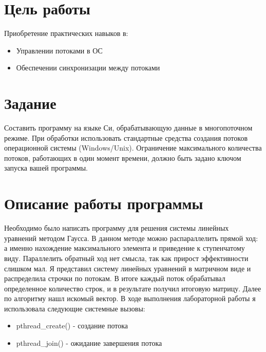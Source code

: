 \documentclass[a4paper, 12pt]{article}
\begin{document}
\section{Цель работы}
Приобретение практических навыков в:
\begin{itemize}
  \item Управлении потоками в ОС
  \item Обеспечении синхронизации между потоками
\end{itemize}

\section{Задание}
Составить программу на языке Си, обрабатывающую данные в многопоточном режиме. При обработки использовать стандартные средства создания потоков операционной системы (Windows/Unix). Ограничение максимального количества потоков, работающих в один момент времени, должно быть задано ключом запуска вашей программы.

\section{Описание работы программы}
Необходимо было написать программу для решения системы линейных уравнений методом Гаусса. В данном методе можно распараллелить прямой ход: а именно нахождение максимального элемента и приведение к ступенчатому виду. Параллелить обратный ход нет смысла, так как прирост эффективности слишком мал. Я представил систему линейных уравнений в матричном виде и распределила строчки по потокам. В итоге каждый поток обрабатывал определенное количество строк, и в результате получил итоговую матрицу. Далее по алгоритму нашл искомый вектор.
В ходе выполнения лабораторной работы я использовала следующие системные вызовы:
\begin{itemize}
  \item pthread\_create() - создание потока
  \item pthread\_join() - ожидание завершения потока
\end{itemize}

\newpage
\end{document}
